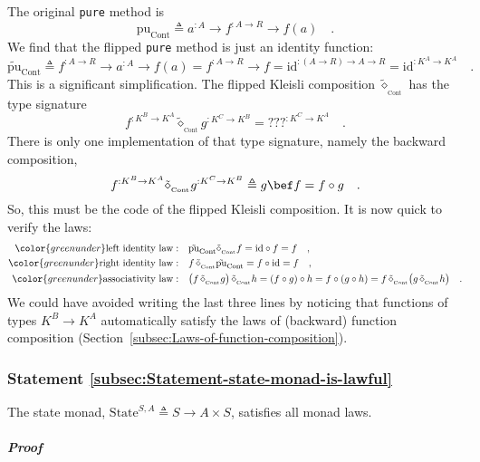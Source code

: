 The original \lstinline!pure! method is 
\[
\text{pu}_{\text{Cont}}\triangleq a^{:A}\rightarrow f^{:A\rightarrow R}\rightarrow f(a)\quad.
\]
We find that the flipped \lstinline!pure! method is just an identity
function:
\[
\tilde{\text{pu}}_{\text{Cont}}\triangleq f^{:A\rightarrow R}\rightarrow a^{:A}\rightarrow f(a)=f^{:A\rightarrow R}\rightarrow f=\text{id}^{:\left(A\rightarrow R\right)\rightarrow A\rightarrow R}=\text{id}^{:K^{A}\rightarrow K^{A}}\quad.
\]
This is a significant simplification. The flipped Kleisli composition
$\tilde{\diamond}_{_{\text{Cont}}}$ has the type signature
\[
f^{:K^{B}\rightarrow K^{A}}\tilde{\diamond}_{_{\text{Cont}}}g^{:K^{C}\rightarrow K^{B}}=\text{???}^{:K^{C}\rightarrow K^{A}}\quad.
\]
There is only one implementation of that type signature, namely the
backward composition,
\[
f^{:K^{B}\rightarrow K^{A}}\tilde{\diamond}_{_{\text{Cont}}}g^{:K^{C}\rightarrow K^{B}}\triangleq g\bef f=f\circ g\quad.
\]
So, this must be the code of the flipped Kleisli composition. It is
now quick to verify the laws:
\begin{align*}
{\color{greenunder}\text{left identity law}:}\quad & \tilde{\text{pu}}_{\text{Cont}}\tilde{\diamond}_{_{\text{Cont}}}f=\text{id}\circ f=f\quad,\\
{\color{greenunder}\text{right identity law}:}\quad & f\,\tilde{\diamond}_{_{\text{Cont}}}\tilde{\text{pu}}_{\text{Cont}}=f\circ\text{id}=f\quad,\\
{\color{greenunder}\text{associativity law}:}\quad & \big(f\,\tilde{\diamond}_{_{\text{Cont}}}g\big)\,\tilde{\diamond}_{_{\text{Cont}}}h=(f\circ g)\circ h=f\circ(g\circ h)=f\,\tilde{\diamond}_{_{\text{Cont}}}\big(g\,\tilde{\diamond}_{_{\text{Cont}}}h\big)\quad.
\end{align*}
We could have avoided writing the last three lines by noticing that
functions of types $K^{B}\rightarrow K^{A}$ automatically satisfy
the laws of (backward) function composition (Section~\ref{subsec:Laws-of-function-composition}).

\subsubsection{Statement \label{subsec:Statement-state-monad-is-lawful}\ref{subsec:Statement-state-monad-is-lawful}}

The state monad, $\text{State}^{S,A}\triangleq S\rightarrow A\times S$,
satisfies all monad laws.

\subparagraph{Proof}

